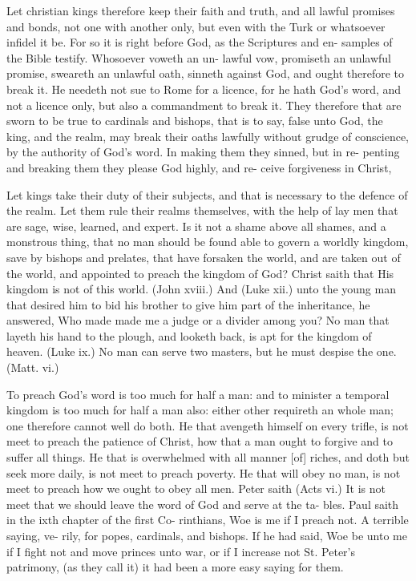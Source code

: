 \documentclass{custom}
\begin{document}
Let christian kings therefore keep their faith and truth, 
and all lawful promises and bonds, not one with another 
only, but even with the Turk or whatsoever infidel it be. 
For so it is right before God, as the Scriptures and en- 
samples of the Bible testify. Whosoever voweth an un- 
lawful vow, promiseth an unlawful promise, sweareth an 
unlawful oath, sinneth against God, and ought therefore 
to break it. He needeth not sue to Rome for a licence, 
for he hath God's word, and not a licence only, but also a 
commandment to break it. They therefore that are sworn 
to be true to cardinals and bishops, that is to say, false 
unto God, the king, and the realm, may break their oaths 
lawfully without grudge of conscience, by the authority of 
God's word. In making them they sinned, but in re- 
penting and breaking them they please God highly, and re- 
ceive forgiveness in Christ, 

Let kings take their duty of their subjects, and that is 
necessary to the defence of the realm. Let them rule 
their realms themselves, with the help of lay men that are 
sage, wise, learned, and expert. Is it not a shame above 
all shames, and a monstrous thing, that no man should be 
found able to govern a worldly kingdom, save by bishops and 
prelates, that have forsaken the world, and are taken out of
the world, and appointed to preach the kingdom of God?
Christ saith that His kingdom is not of this world. (John 
xviii.) And (Luke xii.) unto the young man that desired
him to bid his brother to give him part of the inheritance, 
he answered, Who made made me a judge or a divider 
among you? No man that layeth his hand to the plough, 
and looketh back, is apt for the kingdom of heaven. (Luke 
ix.) No man can serve two masters, but he must despise 
the one. (Matt. vi.) 

To preach God's word is too much for half a man: and 
to minister a temporal kingdom is too much for half a man 
also: either other requireth an whole man; one therefore 
cannot well do both. He that avengeth himself on every 
trifle, is not meet to preach the patience of Christ, how 
that a man ought to forgive and to suffer all things. He
that is overwhelmed with all manner [of] riches, and doth 
but seek more daily, is not meet to preach poverty. He 
that will obey no man, is not meet to preach how we ought 
to obey all men. Peter saith (Acts vi.) It is not meet 
that we should leave the word of God and serve at the ta-
bles. Paul saith in the ixth chapter of the first Co- 
rinthians, Woe is me if I preach not. A terrible saying, ve-
rily, for popes, cardinals, and bishops. If he had said, Woe 
be unto me if I fight not and move princes unto war, or if 
I increase not St. Peter's patrimony, (as they call it) it had 
been a more easy saying for them. 
\end{document}
